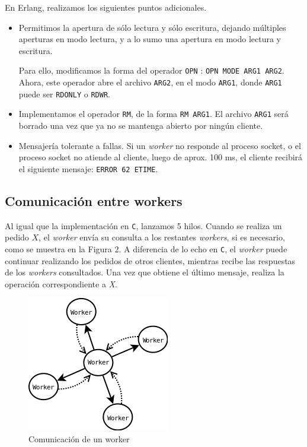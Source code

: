 \documentclass[a4paper, 8pt]{article}
\begin{document}
En Erlang, realizamos los siguientes puntos adicionales.

\begin{itemize}
  \item Permitimos la apertura de sólo lectura y sólo escritura, dejando múltiples aperturas en modo lectura, y a lo sumo
  una apertura en modo lectura y escritura.
  
  Para ello, modificamos la forma del operador \texttt{OPN} :
  \texttt{OPN MODE ARG1 ARG2}. Ahora, este operador abre el archivo \texttt{ARG2}, en el modo \texttt{ARG1},
  donde \texttt{ARG1} puede ser \texttt{RDONLY} o \texttt{RDWR}.
  
  \item Implementamos el operador \texttt{RM}, de la forma
  \texttt{RM ARG1}. El archivo \texttt{ARG1} será borrado una vez que ya no se mantenga abierto por ningún cliente.
  
  \item Mensajería tolerante a fallas. Si un \textit{worker} no responde al proceso socket, o el proceso socket no atiende
  al cliente, luego de aprox. 100 ms, el cliente recibirá el siguiente mensaje: \texttt{ERROR 62 ETIME}.
 
\end{itemize}

  \subsection{Comunicación entre workers}
  Al igual que la implementación en \texttt{C}, lanzamos 5 hilos. 
  Cuando se realiza un pedido $X$, el \textit{worker} envía su consulta a los restantes \textit{workers}, si es necesario, como se muestra en la Figura 2.
  A diferencia de lo echo en \texttt{C}, el \textit{worker} puede continuar realizando los pedidos de otros clientes, mientras recibe las
  respuestas de los \textit{workers} consultados.
  Una vez que obtiene el último mensaje, realiza la operación correspondiente a \textit{X}.
  
 \begin{figure}[htbp]
   \centering
     \includegraphics[scale=0.75]{dia2}
     \caption{Comunicación de un worker}
   \label{Figura 2}
 \end{figure}
  
\end{document}
